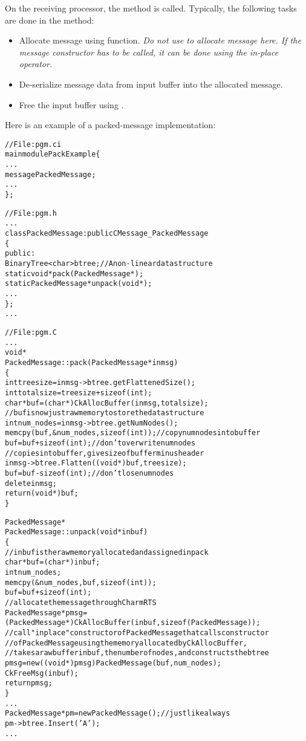 On the receiving processor, the  method is called. Typically, the
following tasks are done in the  method:

\begin{itemize}

\item Allocate message using  function. {\em Do not
use  to allocate message here. If the message constructor has
to be called, it can be done using the in-place  operator.}

\item De-serialize message data from input buffer into the allocated message.

\item Free the input buffer using .

\end{itemize}

Here is an example of a packed-message implementation:

\begin{alltt}
// File: pgm.ci
mainmodule PackExample \{
  ...
  message PackedMessage;
  ...
\};

// File: pgm.h
...
class PackedMessage : public CMessage_PackedMessage
\{
  public:
    BinaryTree<char> btree; // A non-linear data structure 
    static void* pack(PackedMessage*);
    static PackedMessage* unpack(void*);
    ...
\};
...

// File: pgm.C
...
void*
PackedMessage::pack(PackedMessage* inmsg)
\{
  int treesize = inmsg->btree.getFlattenedSize();
  int totalsize = treesize + sizeof(int);
  char *buf = (char*)CkAllocBuffer(inmsg, totalsize);
  // buf is now just raw memory to store the data structure
  int num_nodes = inmsg->btree.getNumNodes();
  memcpy(buf, &num_nodes, sizeof(int));  // copy numnodes into buffer
  buf = buf + sizeof(int);               // don't overwrite numnodes
  // copies into buffer, give size of buffer minus header
  inmsg->btree.Flatten((void*)buf, treesize);    
  buf = buf - sizeof(int);              // don't lose numnodes
  delete inmsg;
  return (void*) buf;
\}

PackedMessage*
PackedMessage::unpack(void* inbuf)
\{
  // inbuf is the raw memory allocated and assigned in pack
  char* buf = (char*) inbuf;
  int num_nodes;
  memcpy(&num_nodes, buf, sizeof(int));
  buf = buf + sizeof(int);
  // allocate the message through Charm RTS
  PackedMessage* pmsg = 
    (PackedMessage*)CkAllocBuffer(inbuf, sizeof(PackedMessage));
  // call "inplace" constructor of PackedMessage that calls constructor
  // of PackedMessage using the memory allocated by CkAllocBuffer,
  // takes a raw buffer inbuf, the number of nodes, and constructs the btree
  pmsg = new ((void*)pmsg) PackedMessage(buf, num_nodes);  
  CkFreeMsg(inbuf);
  return pmsg;
\}
... 
PackedMessage* pm = new PackedMessage();  // just like always 
pm->btree.Insert('A');
...
\end{alltt}


